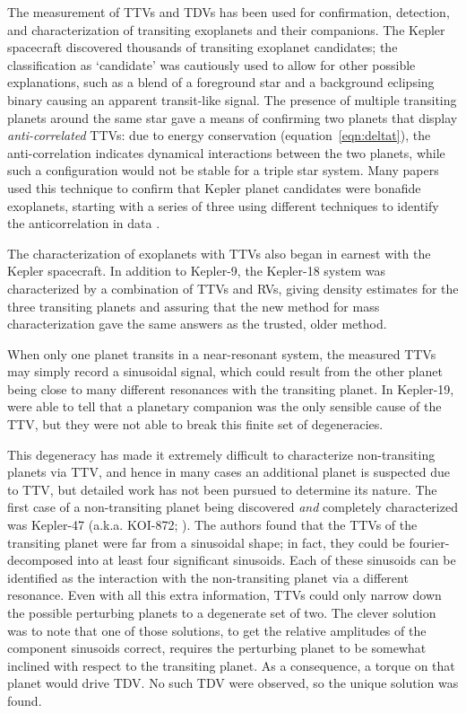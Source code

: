 \documentclass[graybox,natbib,nosecnum]{svmult}
\begin{document}
The measurement of TTVs and TDVs has been used for confirmation, detection, and characterization of
transiting exoplanets and their companions.  The Kepler spacecraft discovered thousands of transiting
exoplanet candidates;  the classification as `candidate' was cautiously used to allow for other
possible explanations, such as a blend of a foreground star and a background eclipsing binary causing
an apparent transit-like signal.  The presence of multiple transiting planets around the same star
gave a means of confirming two planets that display {\em anti-correlated} TTVs: due to energy conservation (equation~\ref{eqn:deltat}), the anti-correlation indicates dynamical interactions between the
two planets, while such a configuration would not be stable for a triple star system.  Many papers 
used this technique to confirm that Kepler planet candidates were bonafide exoplanets, starting with a series of three using different techniques to identify the anticorrelation in data \citet{2011ApJS..197....2F, 2012ApJ...750..113F, 2012ApJ...750..114F}.

The characterization of exoplanets with TTVs also began in earnest with the Kepler spacecraft.
In addition to Kepler-9, the Kepler-18 system was characterized by a combination of TTVs and
RVs, giving density estimates for the three transiting planets \citep{2011ApJS..197....7C} and assuring that the new method for mass characterization gave the same answers as the trusted, older method.

When only one planet transits in a near-resonant system, the measured TTVs may simply record a sinusoidal signal, which could result from the other planet being close to many different resonances with the transiting planet.  In Kepler-19, \cite{2011ApJ...743..200B} were able to tell that a planetary companion was the only sensible cause of the TTV, but they were not able to break this finite set of degeneracies. 

This degeneracy has made it extremely difficult to characterize non-transiting planets via TTV, and hence in many cases an additional planet is suspected due to TTV, but detailed work has not been pursued to determine its nature.  The first case of a non-transiting planet being discovered \emph{and} completely characterized was Kepler-47 (a.k.a. KOI-872; \citealt{2012Sci...336.1133N}).  The authors found that the TTVs of the transiting planet were far from a sinusoidal shape; in fact, they could be fourier-decomposed into at least four significant sinusoids.  Each of these sinusoids can be identified as the interaction with the non-transiting planet via a different resonance.  Even with all this extra information, TTVs could only narrow down the possible perturbing planets to a degenerate set of two.  The clever solution \citep{2012Sci...336.1133N} was to note that one of those solutions, to get the relative amplitudes of the component sinusoids correct,  requires the perturbing planet to be somewhat inclined with respect to the transiting planet.  As a consequence, a torque on that planet would drive TDV.  No such TDV were observed, so the unique solution was found. 
\end{document}
